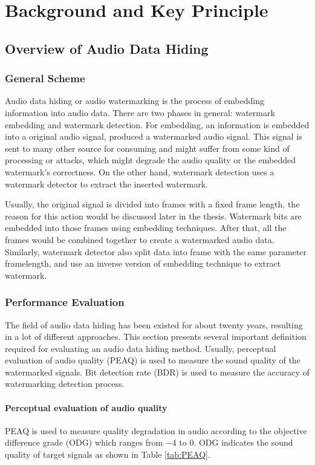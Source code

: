 \chapter{Background and Key Principle}

\section{Overview of Audio Data Hiding}

\subsection {General Scheme}
Audio data hiding or audio watermarking is the process of embedding information into audio data. There are two phases in general: watermark embedding and watermark detection. For embedding, an information is embedded into a original audio signal, produced a watermarked audio signal. This signal is sent to many other source for consuming and might suffer from some kind of processing or attacks, which might degrade the audio quality or the embedded watermark's correctness. On the other hand, watermark detection uses a watermark detector to extract the inserted watermark.

Usually, the original signal is divided into frames with a fixed frame length, the reason for this action would be discussed later in the thesis. Watermark bits are embedded into those frames using embedding techniques. After that, all the frames would be combined together to create a watermarked audio data. Similarly, watermark detector also split data into frame with the same parameter framelength, and use an inverse version of embedding technique to extract watermark.

\subsection {Performance Evaluation}
The field of audio data hiding has been existed for about twenty years, resulting in a lot of different approaches. This section presents several important definition required for evaluating an audio data hiding method. Usually, perceptual evaluation of audio quality (PEAQ) is used to measure the sound quality of the watermarked signals. Bit detection rate (BDR) is used to measure the accuracy of watermarking detection process.
\subsubsection*{Perceptual evaluation of audio quality}
PEAQ is used to measure quality degradation in audio according to the objective difference grade (ODG) which ranges from −4 to 0. ODG indicates the sound quality of target signals as shown in Table \ref{tab:PEAQ}.


